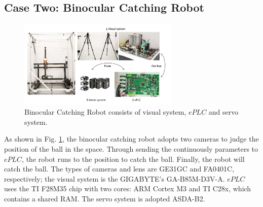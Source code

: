 \documentclass[journal,UTF8]{IEEEtran}
\begin{document}
 
\subsection{Case Two: Binocular Catching Robot}
\begin{figure}
	\centering
	\includegraphics[width=3in]{fig/robot.pdf}
	\caption{ Binocular Catching Robot consists of visual system, $ePLC$ and servo system.}
	\label{fig:robot}
\end{figure}
As shown in Fig. \ref{fig:robot}, the binocular catching robot adopts two cameras to judge the position of the ball in the space. Through sending the continuously parameters to $ePLC$, the robot runs to the position to catch the ball. Finally, the robot will catch the ball. The types of cameras and lens are GE31GC and FA0401C, respectively; the visual system is the GIGABYTE's GA-B85M-D3V-A. $ePLC$ uses the TI F28M35 chip with two cores: ARM Cortex M3 and TI C28x, which contains a shared RAM. The servo system is adopted ASDA-B2. 
\end{document}
